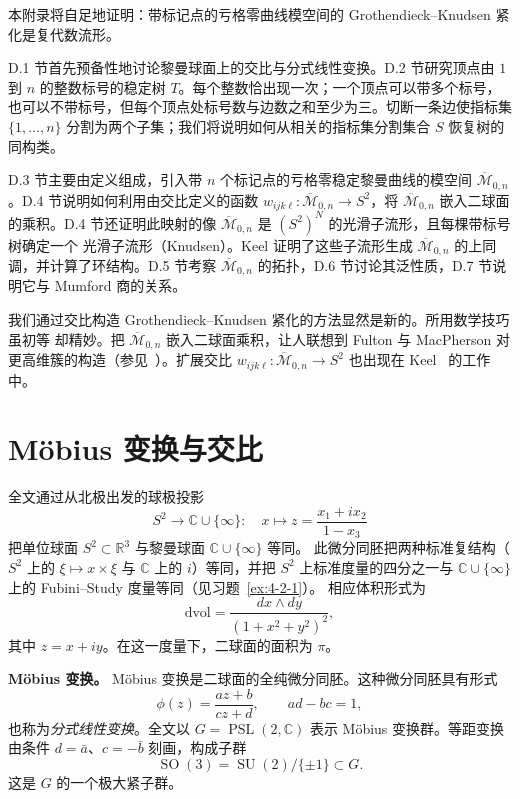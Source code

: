 
本附录将自足地证明：带标记点的亏格零曲线模空间的 Grothendieck--Knudsen 紧化是复代数流形。

D.1 节首先预备性地讨论黎曼球面上的交比与分式线性变换。D.2 节研究顶点由
$1$ 到 $n$ 的整数标号的稳定树 $T$。每个整数恰出现一次；一个顶点可以带多个标号，
也可以不带标号，但每个顶点处标号数与边数之和至少为三。切断一条边使指标集
$\{1,\ldots,n\}$ 分割为两个子集；我们将说明如何从相关的指标集分割集合 $S$
恢复树的同构类。

D.3 节主要由定义组成，引入带 $n$ 个标记点的亏格零稳定黎曼曲线的模空间
$\overline{\mathcal M}_{0,n}$。D.4 节说明如何利用由交比定义的函数
$w_{ijk\ell}:\overline{\mathcal M}_{0,n}\to S^2$，将
$\overline{\mathcal M}_{0,n}$ 嵌入二球面的乘积。D.4 节还证明此映射的像
$\overline{\mathcal M}_{0,n}$ 是 $(S^2)^N$ 的光滑子流形，且每棵带标号树确定一个
光滑子流形（Knudsen）。Keel 证明了这些子流形生成
$\overline{\mathcal M}_{0,n}$ 的上同调，并计算了环结构。D.5 节考察
$\overline{\mathcal M}_{0,n}$ 的拓扑，D.6 节讨论其泛性质，D.7 节说明它与
Mumford 商的关系。

我们通过交比构造 Grothendieck--Knudsen 紧化的方法显然是新的。所用数学技巧虽初等
却精妙。把 $\overline{\mathcal M}_{0,n}$ 嵌入二球面乘积，让人联想到 Fulton 与
MacPherson 对更高维簇的构造（参见~）。扩展交比
$w_{ijk\ell}:\overline{\mathcal M}_{0,n}\to S^2$ 也出现在 Keel~ 的工作中。

\section{Möbius 变换与交比}\label{sec:D-1}

全文通过从北极出发的球极投影
\[
  S^2\longrightarrow\mathbb C\cup\{\infty\}:\quad
  x\longmapsto z=\frac{x_1+ix_2}{1-x_3}
\]
把单位球面 $S^2\subset\mathbb R^3$ 与黎曼球面 $\mathbb C\cup\{\infty\}$ 等同。
此微分同胚把两种标准复结构（$S^2$ 上的 $\xi\mapsto x\times\xi$ 与
$\mathbb C$ 上的 $i$）等同，并把 $S^2$ 上标准度量的四分之一与
$\mathbb C\cup\{\infty\}$ 上的 Fubini--Study 度量等同（见习题~\ref{ex:4-2-1}）。
相应体积形式为
\[
  \mathrm{dvol}=\frac{dx\wedge dy}{(1+x^2+y^2)^2},
\]
其中 $z=x+iy$。在这一度量下，二球面的面积为 $\pi$。

\noindent\textbf{Möbius 变换。}
Möbius 变换是二球面的全纯微分同胚。这种微分同胚具有形式
\[
  \phi(z)=\frac{az+b}{cz+d},\qquad ad-bc=1,
\]
也称为\emph{分式线性变换}。全文以 $G=\operatorname{PSL}(2,\mathbb C)$ 表示
Möbius 变换群。等距变换由条件 $d=\bar a$、$c=-\bar b$ 刻画，构成子群
\[
  \operatorname{SO}(3)=\operatorname{SU}(2)/\{\pm 1\}\subset G.
\]
这是 $G$ 的一个极大紧子群。

